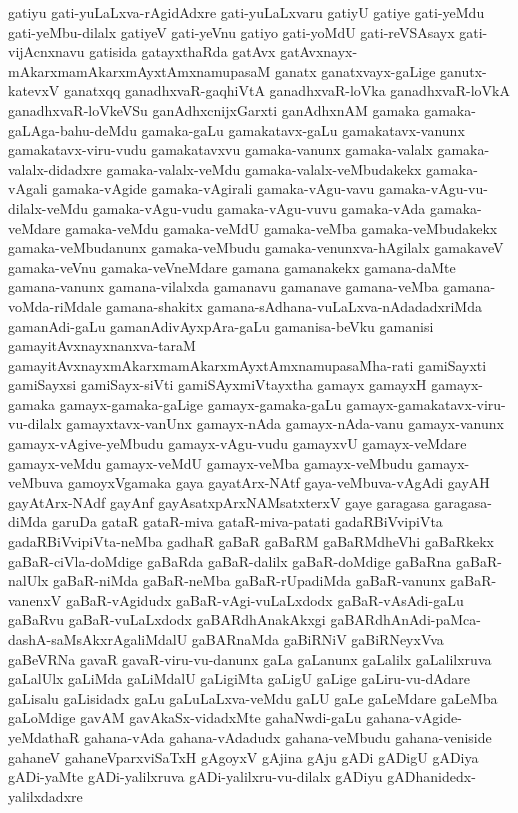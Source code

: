 {gatiyu
gati-yuLaLxva-rAgidAdxre
gati-yuLaLxvaru
gatiyU
gatiye
gati-yeMdu
gati-yeMbu-dilalx
gatiyeV
gati-yeVnu
gatiyo
gati-yoMdU
gati-reVSAsayx
gati-vijAcnxnavu
gatisida
gatayxthaRda
gatAvx
gatAvxnayx-mAkarxmamAkarxmAyxtAmxnamupasaM
ganatx
ganatxvayx-gaLige
ganutx-katevxV
ganatxqq
ganadhxvaR-gaqhiVtA
ganadhxvaR-loVka
ganadhxvaR-loVkA
ganadhxvaR-loVkeVSu
ganAdhxcnijxGarxti
ganAdhxnAM
gamaka
gamaka-gaLAga-bahu-deMdu
gamaka-gaLu
gamakatavx-gaLu
gamakatavx-vanunx
gamakatavx-viru-vudu
gamakatavxvu
gamaka-vanunx
gamaka-valalx
gamaka-valalx-didadxre
gamaka-valalx-veMdu
gamaka-valalx-veMbudakekx
gamaka-vAgali
gamaka-vAgide
gamaka-vAgirali
gamaka-vAgu-vavu
gamaka-vAgu-vu-dilalx-veMdu
gamaka-vAgu-vudu
gamaka-vAgu-vuvu
gamaka-vAda
gamaka-veMdare
gamaka-veMdu
gamaka-veMdU
gamaka-veMba
gamaka-veMbudakekx
gamaka-veMbudanunx
gamaka-veMbudu
gamaka-venunxva-hAgilalx
gamakaveV
gamaka-veVnu
gamaka-veVneMdare
gamana
gamanakekx
gamana-daMte
gamana-vanunx
gamana-vilalxda
gamanavu
gamanave
gamana-veMba
gamana-voMda-riMdale
gamana-shakitx
gamana-sAdhana-vuLaLxva-nAdadadxriMda
gamanAdi-gaLu
gamanAdivAyxpAra-gaLu
gamanisa-beVku
gamanisi
gamayitAvxnayxnanxva-taraM
gamayitAvxnayxmAkarxmamAkarxmAyxtAmxnamupasaMha-rati
gamiSayxti
gamiSayxsi
gamiSayx-siVti
gamiSAyxmiVtayxtha
gamayx
gamayxH
gamayx-gamaka
gamayx-gamaka-gaLige
gamayx-gamaka-gaLu
gamayx-gamakatavx-viru-vu-dilalx
gamayxtavx-vanUnx
gamayx-nAda
gamayx-nAda-vanu
gamayx-vanunx
gamayx-vAgive-yeMbudu
gamayx-vAgu-vudu
gamayxvU
gamayx-veMdare
gamayx-veMdu
gamayx-veMdU
gamayx-veMba
gamayx-veMbudu
gamayx-veMbuva
gamoyxVgamaka
gaya
gayatArx-NAtf
gaya-veMbuva-vAgAdi
gayAH
gayAtArx-NAdf
gayAnf
gayAsatxpArxNAMsatxterxV
gaye
garagasa
garagasa-diMda
garuDa
gataR
gataR-miva
gataR-miva-patati
gadaRBiVvipiVta
gadaRBiVvipiVta-neMba
gadhaR
gaBaR
gaBaRM
gaBaRMdheVhi
gaBaRkekx
gaBaR-ciVla-doMdige
gaBaRda
gaBaR-dalilx
gaBaR-doMdige
gaBaRna
gaBaR-nalUlx
gaBaR-niMda
gaBaR-neMba
gaBaR-rUpadiMda
gaBaR-vanunx
gaBaR-vanenxV
gaBaR-vAgidudx
gaBaR-vAgi-vuLaLxdodx
gaBaR-vAsAdi-gaLu
gaBaRvu
gaBaR-vuLaLxdodx
gaBARdhAnakAkxgi
gaBARdhAnAdi-paMca-dashA-saMsAkxrAgaliMdalU
gaBARnaMda
gaBiRNiV
gaBiRNeyxVva
gaBeVRNa
gavaR
gavaR-viru-vu-danunx
gaLa
gaLanunx
gaLalilx
gaLalilxruva
gaLalUlx
gaLiMda
gaLiMdalU
gaLigiMta
gaLigU
gaLige
gaLiru-vu-dAdare
gaLisalu
gaLisidadx
gaLu
gaLuLaLxva-veMdu
gaLU
gaLe
gaLeMdare
gaLeMba
gaLoMdige
gavAM
gavAkaSx-vidadxMte
gahaNwdi-gaLu
gahana-vAgide-yeMdathaR
gahana-vAda
gahana-vAdadudx
gahana-veMbudu
gahana-veniside
gahaneV
gahaneVparxviSaTxH
gAgoyxV
gAjina
gAju
gADi
gADigU
gADiya
gADi-yaMte
gADi-yalilxruva
gADi-yalilxru-vu-dilalx
gADiyu
gADhanidedx-yalilxdadxre
}
